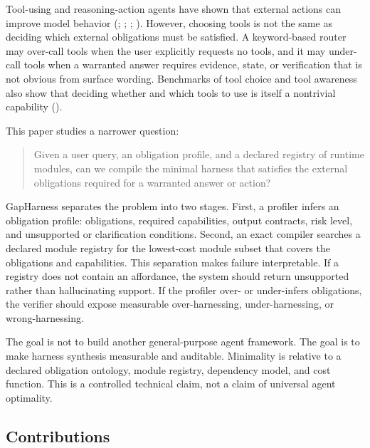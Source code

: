 \documentclass[
  10pt,
]{article}
\begin{document}
Tool-using and reasoning-action agents have shown that external actions
can improve model behavior (; ;
;
). However, choosing tools
is not the same as deciding which external obligations must be
satisfied. A keyword-based router may over-call tools when the user
explicitly requests no tools, and it may under-call tools when a
warranted answer requires evidence, state, or verification that is not
obvious from surface wording. Benchmarks of tool choice and tool
awareness also show that deciding whether and which tools to use is
itself a nontrivial capability ().

This paper studies a narrower question:

\begin{quote}
Given a user query, an obligation profile, and a declared registry of
runtime modules, can we compile the minimal harness that satisfies the
external obligations required for a warranted answer or action?
\end{quote}

GapHarness separates the problem into two stages. First, a profiler
infers an obligation profile: obligations, required capabilities, output
contracts, risk level, and unsupported or clarification conditions.
Second, an exact compiler searches a declared module registry for the
lowest-cost module subset that covers the obligations and capabilities.
This separation makes failure interpretable. If a registry does not
contain an affordance, the system should return unsupported rather than
hallucinating support. If the profiler over- or under-infers
obligations, the verifier should expose measurable over-harnessing,
under-harnessing, or wrong-harnessing.

The goal is not to build another general-purpose agent framework. The
goal is to make harness synthesis measurable and auditable. Minimality
is relative to a declared obligation ontology, module registry,
dependency model, and cost function. This is a controlled technical
claim, not a claim of universal agent optimality.

\subsection{Contributions}\label{contributions}
\end{document}
